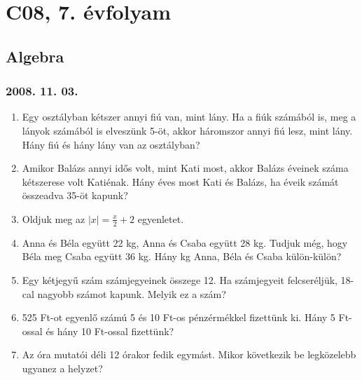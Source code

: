 \chapter{C08, 7. évfolyam}
\section{Algebra}





\subsection*{2008. 11. 03.}
\begin{enumerate}
\item Egy osztályban kétszer annyi fiú van, mint lány. Ha a fiúk számából is, meg a lányok számából is elveszünk 5-öt, akkor háromszor annyi fiú lesz, mint lány. Hány fiú és hány lány van az osztályban?
\item Amikor Balázs annyi idős volt, mint Kati most, akkor Balázs éveinek száma kétszerese volt Katiénak. Hány éves most Kati és Balázs, ha éveik számát összeadva 35-öt kapunk?
\item Oldjuk meg az $|x|=\displaystyle{\frac{x}{2}}+2$ egyenletet.
\item Anna és Béla együtt 22 kg, Anna és Csaba együtt 28 kg. Tudjuk még, hogy Béla meg Csaba együtt 36 kg. Hány kg Anna, Béla és Csaba külön-külön?
\item Egy kétjegyű szám számjegyeinek összege 12. Ha számjegyeit felcseréljük, 18-cal nagyobb számot kapunk. Melyik ez a szám?
\item 525 Ft-ot egyenlő számú 5 és 10 Ft-os pénzérmékkel fizettünk ki. Hány 5 Ft-ossal és hány 10 Ft-ossal fizettünk?
\item Az óra mutatói déli 12 órakor fedik egymást. Mikor következik be legközelebb ugyanez a helyzet?
\end{enumerate}


